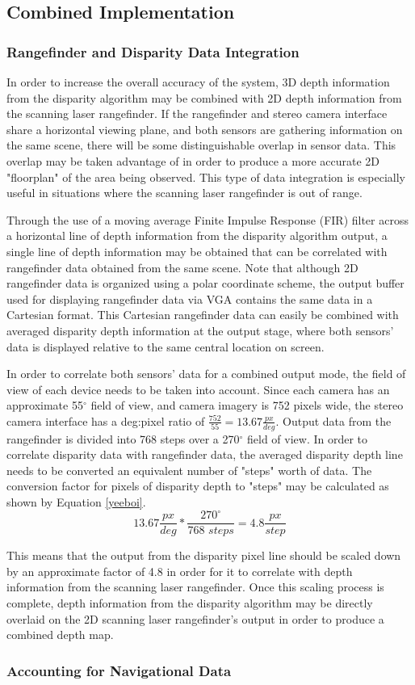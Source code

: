 \subsection{Combined Implementation}
\subsubsection{Rangefinder and Disparity Data Integration}
In order to increase the overall accuracy of the system, 3D depth information from the disparity algorithm may be combined with 2D depth information from the scanning laser rangefinder. If the rangefinder and stereo camera interface share a horizontal viewing plane, and both sensors are gathering information on the same scene, there will be some distinguishable overlap in sensor data. This overlap may be taken advantage of in order to produce a more accurate 2D "floorplan" of the area being observed. This type of data integration is especially useful in situations where the scanning laser rangefinder is out of range.
\par
Through the use of a moving average Finite Impulse Response (FIR) filter across a horizontal line of depth information from the disparity algorithm output, a single line of depth information may be obtained that can be correlated with rangefinder data obtained from the same scene. Note that although 2D rangefinder data is organized using a polar coordinate scheme, the output buffer used for displaying rangefinder data via VGA contains the same data in a Cartesian format. This Cartesian rangefinder data can easily be combined with averaged disparity depth information at the output stage, where both sensors' data is displayed relative to the same central location on screen. 
\par
In order to correlate both sensors' data for a combined output mode, the field of view of each device needs to be taken into account. Since each camera has an approximate 55$^\circ$ field of view, and camera imagery is 752 pixels wide, the stereo camera interface has a deg:pixel ratio of $\frac{752}{55}=13.67\frac{px}{deg}$. Output data from the rangefinder is divided into 768 steps over a 270$^\circ$ field of view. In order to correlate disparity data with rangefinder data, the averaged disparity depth line needs to be converted an equivalent number of "steps" worth of data. The conversion factor for pixels of disparity depth to "steps" may be calculated as shown by Equation \ref{yeeboi}.
\begin{equation} \label{yeeboi}
13.67\frac{px}{deg}*\frac{270^\circ}{768\,\,steps} = 4.8\frac{px}{step}
\end{equation}
\par
This means that the output from the disparity pixel line should be scaled down by an approximate factor of 4.8 in order for it to correlate with depth information from the scanning laser rangefinder. Once this scaling process is complete, depth information from the disparity algorithm may be directly overlaid on the 2D scanning laser rangefinder's output in order to produce a combined depth map. 

\subsubsection{Accounting for Navigational Data}